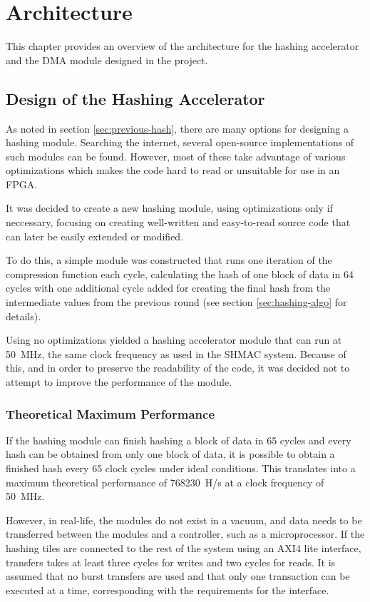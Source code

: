 \chapter{Architecture}

This chapter provides an overview of the architecture for the hashing
accelerator and the DMA module designed in the project.

\section{Design of the Hashing Accelerator}

As noted in section \ref{sec:previous-hash}, there are many options for
designing a hashing module. Searching the internet, several open-source
implementations of such modules can be found. However, most of these
take advantage of various optimizations which makes the code hard to
read or unsuitable for use in an FPGA.

It was decided to create a new hashing module, using optimizations only
if neccessary, focusing on creating well-written and easy-to-read source
code that can later be easily extended or modified.

To do this, a simple module was constructed that runs one iteration of
the compression function each cycle, calculating the hash of one block
of data in 64 cycles with one additional cycle added for creating the
final hash from the intermediate values from the previous round (see
section \ref{sec:hashing-algo} for details).

Using no optimizations yielded a hashing accelerator module that can
run at 50~MHz, the same clock frequency as used in the SHMAC system.
Because of this, and in order to preserve the readability of the code, it
was decided not to attempt to improve the performance of the module.

\subsection{Theoretical Maximum Performance}
If the hashing module can finish hashing a block of data in 65 cycles and
every hash can be obtained from only one block of data, it is possible to
obtain a finished hash every 65 clock cycles under ideal conditions. This
translates into a maximum theoretical performance of 768230~H/s at a clock
frequency of 50~MHz.

However, in real-life, the modules do not exist in a vacuum, and data needs to be transferred
between the modules and a controller, such as a microprocessor. If the hashing tiles
are connected to the rest of the system using an AXI4 lite interface, transfers
takes at least three cycles for writes and two cycles for reads.
It is assumed that no burst transfers are used and that only one transaction
can be executed at a time, corresponding with the requirements for the interface.

